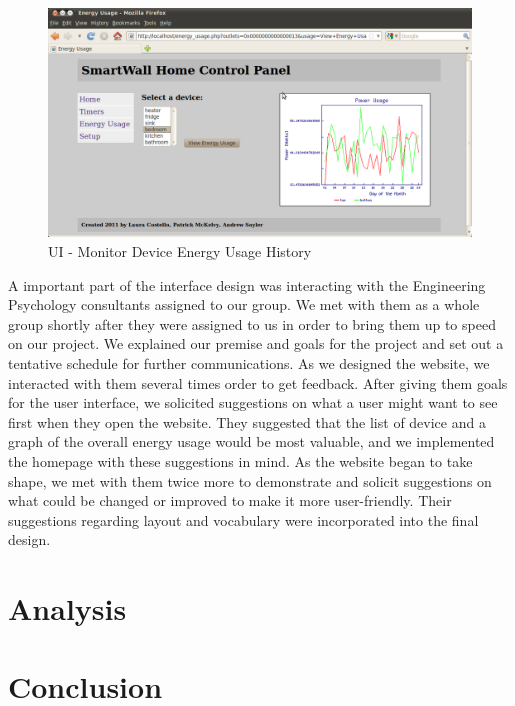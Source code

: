 \documentclass[12pt]{article}
\begin{document}
\begin{figure}
  \begin{center}
    \includegraphics[scale=.3]{webUI-energy.png}
  \end{center}
  \caption{UI - Monitor Device Energy Usage History}
  \label{fig:webUI-energy}
\end{figure}

A important part of the interface design was interacting with the
Engineering Psychology consultants assigned to our group. We met with
them as a whole group shortly after they were assigned to us in order
to bring them up to speed on our project. We explained our premise
and goals for the project and set out a tentative schedule for
further communications. As we designed the website, we interacted
with them several times order to get feedback. After giving them
goals for the user interface, we solicited suggestions on what a user
might want to see first when they open the website. They suggested
that the list of device and a graph of the overall energy usage would
be most valuable, and we implemented the homepage with these
suggestions in mind. As the website began to take shape, we met with
them twice more to demonstrate and solicit suggestions on what could
be changed or improved to make it more user-friendly. Their
suggestions regarding layout and vocabulary were incorporated into
the final design. 

\section{Analysis}



\section{Conclusion}
\end{document}
